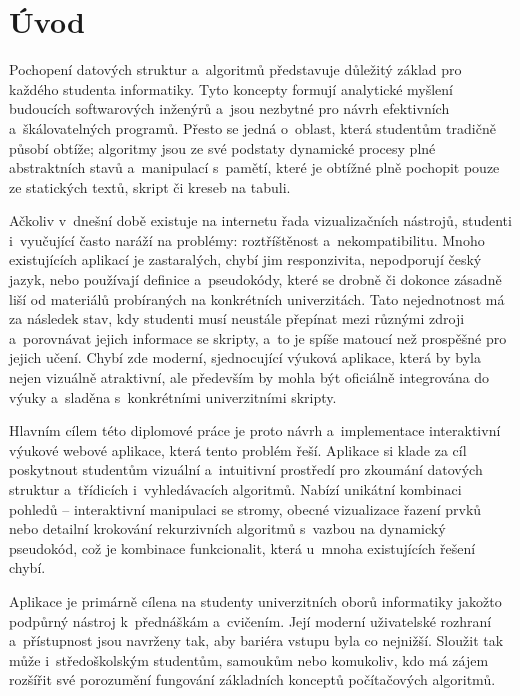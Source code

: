 \chapter{Úvod}
\label{chap:introduction}

Pochopení datových struktur a~algoritmů představuje důležitý základ pro každého studenta informatiky.
Tyto koncepty formují analytické myšlení budoucích softwarových inženýrů a~jsou nezbytné pro návrh efektivních a~škálovatelných programů.
Přesto se jedná o~oblast, která studentům tradičně působí obtíže; algoritmy jsou ze své podstaty dynamické procesy plné abstraktních stavů a~manipulací s~pamětí, které je obtížné plně pochopit pouze ze statických textů, skript či kreseb na tabuli.

Ačkoliv v~dnešní době existuje na internetu řada vizualizačních nástrojů, studenti i~vyučující často naráží na problémy: roztříštěnost a~nekompatibilitu.
Mnoho existujících aplikací je zastaralých, chybí jim responzivita, nepodporují český jazyk, nebo používají definice a~pseudokódy, které se drobně či dokonce zásadně liší od materiálů probíraných na konkrétních univerzitách.
Tato nejednotnost má za následek stav, kdy studenti musí neustále přepínat mezi různými zdroji a~porovnávat jejich informace se skripty, a~to je spíše matoucí než prospěšné pro jejich učení.
Chybí zde moderní, sjednocující výuková aplikace, která by byla nejen vizuálně atraktivní, ale především by mohla být oficiálně integrována do výuky a~sladěna s~konkrétními univerzitními skripty.

Hlavním cílem této diplomové práce je proto návrh a~implementace interaktivní výukové webové aplikace, která tento problém řeší.
Aplikace si klade za cíl poskytnout studentům vizuální a~intuitivní prostředí pro zkoumání datových struktur a~třídicích i~vyhledávacích algoritmů.
Nabízí unikátní kombinaci pohledů -- interaktivní manipulaci se stromy, obecné vizualizace řazení prvků nebo detailní krokování rekurzivních algoritmů s~vazbou na dynamický pseudokód, což je kombinace funkcionalit, která u~mnoha existujících řešení chybí.

Aplikace je primárně cílena na studenty univerzitních oborů informatiky jakožto podpůrný nástroj k~přednáškám a~cvičením.
Její moderní uživatelské rozhraní a~přístupnost jsou navrženy tak, aby bariéra vstupu byla co nejnižší.
Sloužit tak může i~středoškolským studentům, samoukům nebo komukoliv, kdo má zájem rozšířit své porozumění fungování základních konceptů počítačových algoritmů.

